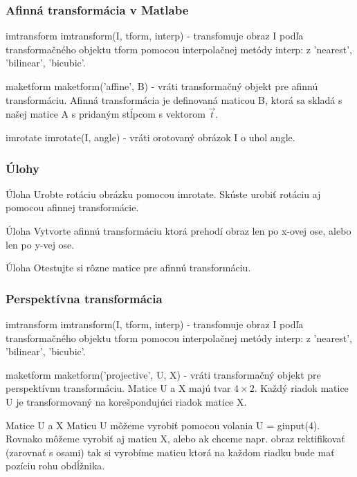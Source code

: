 \documentclass{beamer}
\begin{document}
\begin{frame}
\frametitle{Afinná transformácia v Matlabe}
\begin{block}{imtransform}
imtransform(I, tform, interp) - transfomuje obraz I podľa transformačného objektu tform pomocou interpolačnej metódy interp: z 'nearest', 'bilinear', 'bicubic'.
\end{block}

\begin{block}{maketform}
maketform('affine', B) - vráti transformačný objekt pre afinnú transformáciu. Afinná transformácia je definovaná maticou B, ktorá sa skladá s našej matice A s pridaným stĺpcom s vektorom $\vec{t}$.
\end{block}

\begin{block}{imrotate}
imrotate(I, angle) - vráti orotovaný obrázok I o uhol angle.
\end{block}
\end{frame}


\begin{frame}
\frametitle{Úlohy}
\begin{block}{Úloha}
Urobte rotáciu obrázku pomocou imrotate. Skúste urobiť rotáciu aj pomocou afinnej transformácie.
\end{block}

\begin{block}{Úloha}
Vytvorte afinnú transformáciu ktorá prehodí obraz len po x-ovej ose, alebo len po y-vej ose.
\end{block}

\begin{block}{Úloha}
Otestujte si rôzne matice pre afinnú transformáciu.
\end{block}
\end{frame}


\begin{frame}
\frametitle{Perspektívna transformácia}
\begin{block}{imtransform}
imtransform(I, tform, interp) - transfomuje obraz I podľa transformačného objektu tform pomocou interpolačnej metódy interp: z 'nearest', 'bilinear', 'bicubic'.
\end{block}

\begin{block}{maketform}
maketform('projective', U, X) - vráti transformačný objekt pre perspektívnu transformáciu. Matice U a X majú tvar $4 \times 2$. Každý riadok matice U je transformovaný na korešpondujúci riadok matice X. 
\end{block}

\begin{block}{Matice U a X}
Maticu U môžeme vyrobiť pomocou volania U = ginput(4). Rovnako môžeme vyrobiť aj maticu X, alebo ak chceme napr. obraz rektifikovať (zarovnať s osami) tak si vyrobíme maticu ktorá na každom riadku bude mať pozíciu rohu obdĺžnika.
\end{block}
\end{frame}
\end{document}
